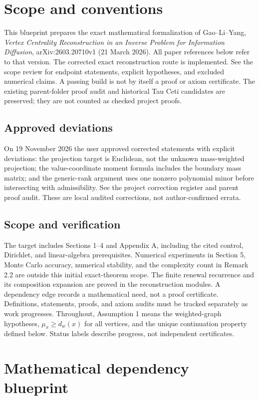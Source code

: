 \chapter{Scope and conventions}
This blueprint prepares the exact mathematical formalization of Gao--Li--Yang,
\emph{Vertex Centrality Reconstruction in an Inverse Problem for Information Diffusion},
arXiv:2603.20710v1 (21 March 2026). All paper references below refer to that version.
The corrected exact reconstruction route is implemented. See the scope review
for endpoint statements, explicit hypotheses, and excluded numerical claims. A passing build
is not by itself a proof or axiom certificate. The existing parent-folder proof audit and historical
Tau Ceti candidates are preserved; they are not counted as checked project proofs.

\section{Approved deviations}
On 19 November 2026 the user approved corrected statements with explicit deviations:
the projection target is Euclidean, not the unknown mass-weighted projection;
the value-coordinate moment formula includes the boundary mass matrix;
and the generic-rank argument uses one nonzero polynomial minor before intersecting
with admissibility. See the project correction register and parent proof audit.
These are local audited corrections, not author-confirmed errata.

\section{Scope and verification}
The target includes Sections 1--4 and Appendix A, including the cited control,
Dirichlet, and linear-algebra prerequisites. Numerical experiments in Section 5,
Monte Carlo accuracy, numerical stability, and the complexity count in Remark 2.2
are outside this initial exact-theorem scope. The finite renewal recurrence and
its composition expansion are proved in the reconstruction modules.
A dependency edge records a mathematical need, not a proof certificate.
Definitions, statements, proofs, and axiom audits must be tracked separately as work progresses.
Throughout, Assumption 1 means the weighted-graph hypotheses,
$\mu_x\geq d_w(x)$ for all vertices, and the unique continuation property
defined below. Status labels describe progress, not independent certificates.

\chapter{Mathematical dependency blueprint}
\nodebreak
